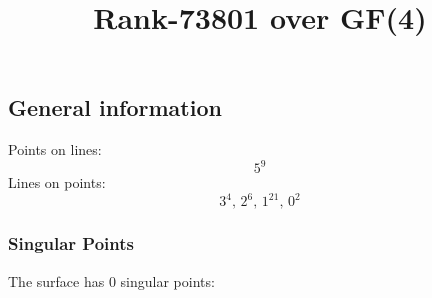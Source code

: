 \documentclass{article}
\newcommand\setTBstruts{\def\T{\rule{0pt}{2.6ex}}%
\def\B{\rule[-1.2ex]{0pt}{0pt}}}
\begin{document}
 
\setTBstruts



{\allowdisplaybreaks%






\title{Rank-73801 over GF(4)}
\author{}%
\maketitle%
%
{}



\subsection*{General information}
Points on lines:
$$
5^9$$
Lines on points:
$$
3^4,\,2^6,\,1^{21},\,0^2$$
\subsubsection*{Singular Points}
The surface has 0 singular points:\\
\begin{align*}
\end{align*}
}
\end{document}
